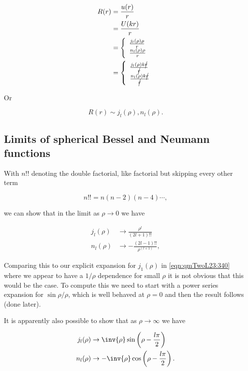 \begin{align*}
R(r)
&= \frac{u(r)}{r}  \\
&= \frac{U(kr)}{r}  \\
&=
\left\{
\begin{array}{l}
\frac{j_l(\rho) \rho}{r} \\
\frac{n_l(\rho) \rho}{r}
\end{array}
\right. \\
&=
\left\{
\begin{array}{l}
\frac{j_l(\rho) k \cancel{r}}{\cancel{r}} \\
\frac{n_l(\rho) k \cancel{r}}{\cancel{r}}
\end{array}
\right.
\end{align*}

Or

\begin{equation}\label{eqn:qmTwoL23:360}
R(r) \sim j_l(\rho), n_l(\rho).
\end{equation}

\subsection{Limits of spherical Bessel and Neumann functions}

With $n!!$ denoting the double factorial, like factorial but skipping every other term

\begin{equation}\label{eqn:qmTwoL23:400}
n!! = n(n-2)(n-4) \cdots,
\end{equation}

we can show that in the limit as $\rho \rightarrow 0$ we have

\begin{align}\label{eqn:qmTwoL23:380}
j_l(\rho) &\rightarrow \frac{\rho^l}{(2 l + 1)!!} \\
n_l(\rho) &\rightarrow -\frac{(2 l - 1)!!}{\rho^{(l+1)}},
\end{align}

Comparing this to our explicit expansion for $j_1(\rho)$ in \ref{eqn:qmTwoL23:340} where we appear to have a $1/\rho$ dependence for small $\rho$ it is not obvious that this would be the case.  To compute this we need to start with a power series expansion for $\sin\rho/\rho$, which is well behaved at $\rho =0$ and then the result follows (done later).

It is apparently also possible to show that as $\rho \rightarrow \infty$ we have

\begin{align}\label{eqn:qmTwoL23:420}
j_l(\rho) &\rightarrow \inv{\rho} \sin\left( \rho - \frac{l \pi}{2} \right) \\
n_l(\rho) &\rightarrow -\inv{\rho} \cos\left( \rho - \frac{l \pi}{2} \right) .
\end{align}


